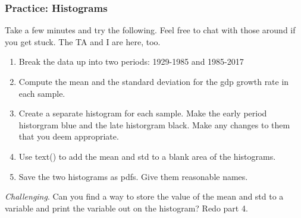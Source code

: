 \documentclass[11pt]{article}
\providecommand{\tightlist}{%
      \setlength{\itemsep}{0pt}\setlength{\parskip}{0pt}}
\begin{document}
    \hypertarget{practice-histograms}{%
\subsubsection{Practice: Histograms}\label{practice-histograms}}

Take a few minutes and try the following. Feel free to chat with those
around if you get stuck. The TA and I are here, too.

\begin{enumerate}
\def\labelenumi{\arabic{enumi}.}
\tightlist
\item
  Break the data up into two periods: 1929-1985 and 1985-2017
\item
  Compute the mean and the standard deviation for the gdp growth rate in
  each sample.
\item
  Create a separate histogram for each sample. Make the early period
  historgram blue and the late historgram black. Make any changes to
  them that you deem appropriate.
\item
  Use text() to add the mean and std to a blank area of the histograms.
\item
  Save the two histograms as pdfs. Give them reasonable names.
\end{enumerate}

\emph{Challenging}. Can you find a way to store the value of the mean
and std to a variable and print the variable out on the histogram? Redo
part 4.
\end{document}
